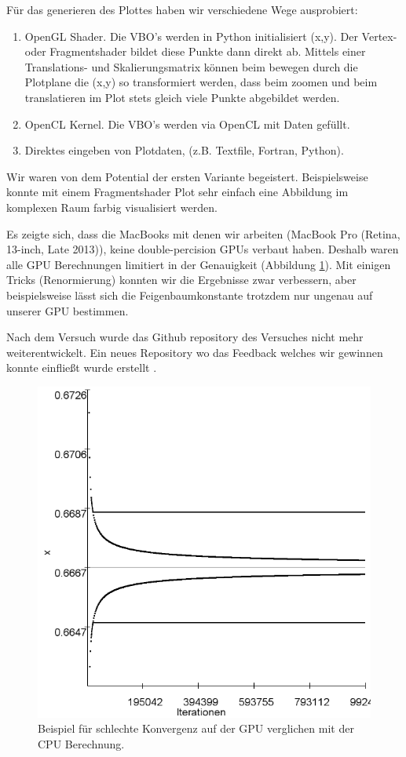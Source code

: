 \documentclass[12pt,a4paper]{article}
\begin{document}
Für das generieren des Plottes haben wir verschiedene Wege ausprobiert:
\begin{enumerate}
\item OpenGL Shader. Die VBO's werden in Python initialisiert (x,y). Der Vertex- oder Fragmentshader bildet diese Punkte dann direkt ab. Mittels einer Translations- und Skalierungsmatrix können beim bewegen durch die Plotplane die (x,y) so transformiert werden, dass beim zoomen und beim translatieren im Plot stets gleich viele Punkte abgebildet werden. 
\item OpenCL Kernel. Die VBO's werden via OpenCL mit Daten gefüllt. 
\item Direktes eingeben von Plotdaten, (z.B. Textfile, Fortran, Python).
\end{enumerate}
Wir waren von dem Potential der ersten Variante begeistert. Beispielsweise konnte mit einem Fragmentshader Plot sehr einfach eine Abbildung im komplexen Raum farbig visualisiert werden. 

Es zeigte sich, dass die MacBooks mit denen wir arbeiten (MacBook Pro (Retina, 13-inch, Late 2013)), keine double-percision GPUs verbaut haben. Deshalb waren alle GPU Berechnungen limitiert in der Genauigkeit (Abbildung \ref{fig:bsp-opencl}). 
Mit einigen Tricks (Renormierung) konnten wir die Ergebnisse zwar verbessern, aber beispielsweise lässt sich die Feigenbaumkonstante trotzdem nur ungenau auf unserer GPU bestimmen.

Nach dem Versuch wurde das Github repository des Versuches nicht mehr weiterentwickelt. Ein neues Repository wo das Feedback welches wir gewinnen konnte einfließt wurde erstellt \parencite{github-future}. 

\begin{figure}[!htbp]
\centering
\includegraphics[scale=0.25]{log-konv-r3}
\caption{Beispiel für schlechte Konvergenz auf der GPU verglichen mit der CPU Berechnung.}
\label{fig:bsp-opencl}
\end{figure}
\end{document}
